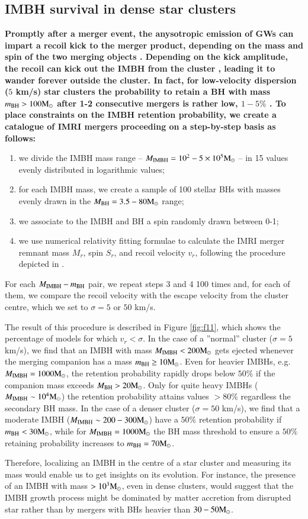 \documentclass[article]{aa}
\newcommand{\Ms}{{\rm M}_\odot}
\newcommand{\ibh}{{\rm IMBH}}
\newcommand{\bh}{{\rm BH}}
\begin{document}
\subsection{IMBH survival in dense star clusters}
{\bf
Promptly after a merger event, the anysotropic emission of GWs can impart a recoil kick to the merger product, depending on the mass and spin of the two merging objects \citep{campanelli07,gonzalez07,lousto08,lousto12}. Depending on the kick amplitude, the recoil can kick out the IMBH from the cluster \citep[e.g.][]{bockelmann08}, leading it to wander forever outside the cluster. In fact, for low-velocity dispersion ($5$ km/s) star clusters the probability to retain a BH with mass $m_\bh> 100 \Ms$ after 1-2 consecutive mergers is rather low, $1-5\%$ \citep{arca20}. To place constraints on the IMBH retention probability, we create a catalogue of IMRI mergers proceeding on a step-by-step basis as follows: 
\begin{enumerate}
\item we divide the IMBH mass range -- $M_\ibh = 10^2-5\times 10^5\Ms$ -- in 15 values evenly distributed in logarithmic values;
\item for each IMBH mass, we create a sample of 100 stellar BHs with masses evenly drawn in the $M_\bh = 3.5-80 \Ms$ range;
\item we associate to the IMBH and BH a spin randomly drawn between 0-1;
\item we use \cite{jimenez17} numerical relativity fitting formulae to calculate the IMRI merger remnant mass $M_r$, spin $S_r$, and recoil velocity $v_r$, following the procedure depicted in \cite{arca20}.
\end{enumerate}
For each $M_\ibh -m_\bh$ pair, we repeat steps 3 and 4 100 times and, for each of them, we compare the recoil velocity with the escape velocity from the cluster centre, which we set to $\sigma = 5$ or $50$ km/s. 

The result of this procedure is described in Figure \ref{fig:f11}, which shows the percentage of models for which $v_r < \sigma$. In the case of 
a ''normal'' cluster ($\sigma = 5$ km/s), we find that an IMBH with mass $M_\ibh < 200 \Ms$ gets ejected whenever the merging companion has a mass $m_\bh \geq 10 \Ms$. Even for heavier IMBHs, e.g. $M_\ibh = 1000\Ms$, the retention probability rapidly drops below $50\%$  if the companion mass exceeds $M_\bh > 20\Ms$. Only for quite heavy IMBHs ($M_\ibh \sim 10^4\Ms$) the retention probability attains values $>80\%$ regardless the secondary BH mass. In the case of a denser cluster ($\sigma=50$ km/s), we find that a moderate IMBH ($M_\ibh \sim 200-300 \Ms$) have a $50\%$ retention probability if $m_\bh < 30\Ms$, while for $M_\ibh = 1000\Ms$ the BH mass threshold to ensure a $50\%$ retaining probability increases to $m_\bh = 70\Ms$.

Therefore, localizing an IMBH in the centre of a star cluster and measuring its mass would enable us to get insights on its evolution. For instance, the presence of an IMBH with mass $>10^3\Ms$, even in dense clusters, would suggest that the IMBH growth process might be dominated  by matter accretion from disrupted star rather than by mergers with BHs heavier than $30-50\Ms$.
}
\end{document}
